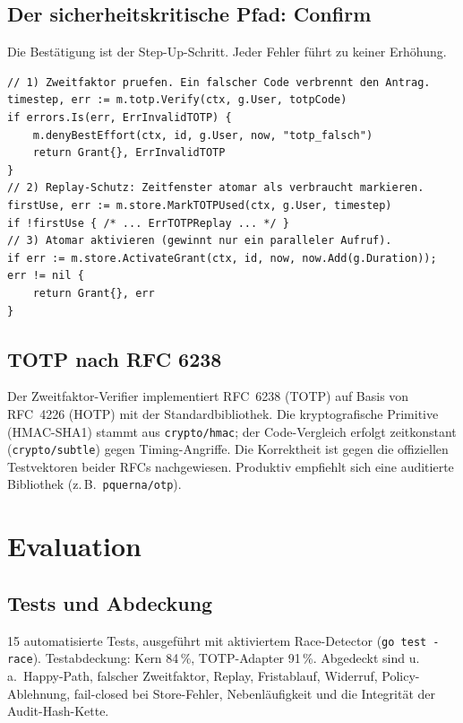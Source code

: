 \documentclass[11pt,a4paper]{article}
\begin{document}
\subsection{Der sicherheitskritische Pfad: Confirm}
Die Bestätigung ist der Step-Up-Schritt. Jeder Fehler führt zu keiner Erhöhung.
\begin{lstlisting}
// 1) Zweitfaktor pruefen. Ein falscher Code verbrennt den Antrag.
timestep, err := m.totp.Verify(ctx, g.User, totpCode)
if errors.Is(err, ErrInvalidTOTP) {
    m.denyBestEffort(ctx, id, g.User, now, "totp_falsch")
    return Grant{}, ErrInvalidTOTP
}
// 2) Replay-Schutz: Zeitfenster atomar als verbraucht markieren.
firstUse, err := m.store.MarkTOTPUsed(ctx, g.User, timestep)
if !firstUse { /* ... ErrTOTPReplay ... */ }
// 3) Atomar aktivieren (gewinnt nur ein paralleler Aufruf).
if err := m.store.ActivateGrant(ctx, id, now, now.Add(g.Duration)); err != nil {
    return Grant{}, err
}
\end{lstlisting}

\subsection{TOTP nach RFC 6238}
Der Zweitfaktor-Verifier implementiert RFC~6238 (TOTP) auf Basis von RFC~4226
(HOTP) mit der Standardbibliothek. Die kryptografische Primitive (HMAC-SHA1)
stammt aus \texttt{crypto/hmac}; der Code-Vergleich erfolgt zeitkonstant
(\texttt{crypto/subtle}) gegen Timing-Angriffe. Die Korrektheit ist gegen die
offiziellen Testvektoren beider RFCs nachgewiesen. Produktiv empfiehlt sich eine
auditierte Bibliothek (z.\,B.\ \texttt{pquerna/otp}).

\section{Evaluation}

\subsection{Tests und Abdeckung}
15 automatisierte Tests, ausgeführt mit aktiviertem Race-Detector
(\texttt{go test -race}). Testabdeckung: Kern 84\,\%, TOTP-Adapter 91\,\%.
Abgedeckt sind u.\,a.\ Happy-Path, falscher Zweitfaktor, Replay, Fristablauf,
Widerruf, Policy-Ablehnung, fail-closed bei Store-Fehler, Nebenläufigkeit und
die Integrität der Audit-Hash-Kette.
\end{document}
